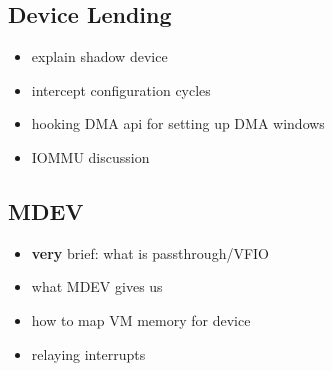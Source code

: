 %        
%
%
%
%
%
\subsection{Device Lending}\label{sec:lending}
\begin{itemize}
    \item explain shadow device
    \item intercept configuration cycles
    \item hooking DMA api for setting up DMA windows
    \item IOMMU discussion
\end{itemize}

\subsection{MDEV}\label{sec:mdev}
\begin{itemize}
    \item \textbf{very} brief: what is passthrough/VFIO
    \item what MDEV gives us
    \item how to map VM memory for device
    \item relaying interrupts
\end{itemize}

